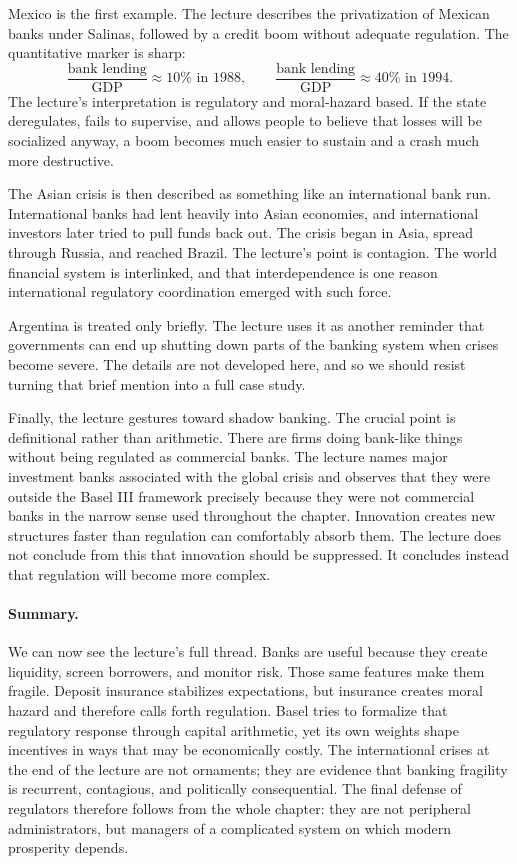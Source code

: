 Mexico is the first example. The lecture describes the privatization of Mexican banks under Salinas, followed by a credit boom without adequate regulation. The quantitative marker is sharp:
\begin{equation}
\frac{\text{bank lending}}{\text{GDP}} \approx 10\% \text{ in 1988},\qquad
\frac{\text{bank lending}}{\text{GDP}} \approx 40\% \text{ in 1994}.
\end{equation}
The lecture's interpretation is regulatory and moral-hazard based. If the state deregulates, fails to supervise, and allows people to believe that losses will be socialized anyway, a boom becomes much easier to sustain and a crash much more destructive.

The Asian crisis is then described as something like an international bank run. International banks had lent heavily into Asian economies, and international investors later tried to pull funds back out. The crisis began in Asia, spread through Russia, and reached Brazil. The lecture's point is contagion. The world financial system is interlinked, and that interdependence is one reason international regulatory coordination emerged with such force.

Argentina is treated only briefly. The lecture uses it as another reminder that governments can end up shutting down parts of the banking system when crises become severe. The details are not developed here, and so we should resist turning that brief mention into a full case study.

Finally, the lecture gestures toward shadow banking. The crucial point is definitional rather than arithmetic. There are firms doing bank-like things without being regulated as commercial banks. The lecture names major investment banks associated with the global crisis and observes that they were outside the Basel III framework precisely because they were not commercial banks in the narrow sense used throughout the chapter. Innovation creates new structures faster than regulation can comfortably absorb them. The lecture does not conclude from this that innovation should be suppressed. It concludes instead that regulation will become more complex.

\paragraph{Summary.} We can now see the lecture's full thread. Banks are useful because they create liquidity, screen borrowers, and monitor risk. Those same features make them fragile. Deposit insurance stabilizes expectations, but insurance creates moral hazard and therefore calls forth regulation. Basel tries to formalize that regulatory response through capital arithmetic, yet its own weights shape incentives in ways that may be economically costly. The international crises at the end of the lecture are not ornaments; they are evidence that banking fragility is recurrent, contagious, and politically consequential. The final defense of regulators therefore follows from the whole chapter: they are not peripheral administrators, but managers of a complicated system on which modern prosperity depends.